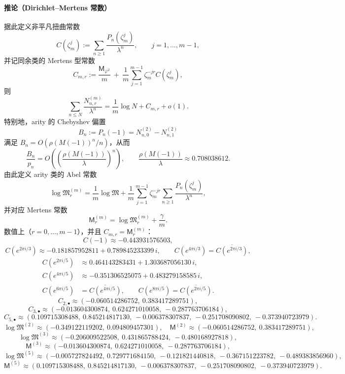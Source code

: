\paragraph{推论（Dirichlet--Mertens 常数）}
据此定义非平凡扭曲常数
\[
C(\zeta_m^j):=\sum_{n\ge 1}\frac{P_n(\zeta_m^j)}{\lambda^n},
\qquad j=1,\dots,m-1,
\]
并记同余类的 Mertens 型常数
\[
C_{m,r}:=\frac{\mathsf{M}_{\varphi^2}}{m}
\ +\ \frac{1}{m}\sum_{j=1}^{m-1}\zeta_m^{-jr}C(\zeta_m^j),
\]
则
\[
\sum_{n\le N}\frac{N_{n,r}^{(m)}}{\lambda^n}
=\frac{1}{m}\log N+C_{m,r}+o(1).
\]
特别地，arity 的 Chebyshev 偏置
\[
B_n:=P_n(-1)=N_{n,0}^{(2)}-N_{n,1}^{(2)}
\]
满足 $B_n=O(\rho(M(-1))^n/n)$，从而
\[
\frac{B_n}{p_n}=O\!\left(\left(\frac{\rho(M(-1))}{\lambda}\right)^n\right),
\qquad
\frac{\rho(M(-1))}{\lambda}\approx 0.708038612.
\]
由此定义 arity 类的 Abel 常数
\[
\log\mathfrak{M}_r^{(m)}
=\frac{1}{m}\log\mathfrak{M}
+\frac{1}{m}\sum_{j=1}^{m-1}\zeta_m^{-jr}\sum_{n\ge 1}\frac{P_n(\zeta_m^j)}{\lambda^n},
\]
并对应 Mertens 常数
\[
\mathsf{M}_r^{(m)}=\log\mathfrak{M}_r^{(m)}+\frac{\gamma}{m}.
\]
数值上（$r=0,\dots,m-1$），并且 $C_{m,r}=\mathsf{M}_r^{(m)}$：
\[
C(-1)\approx -0.443931576503,
\]
\[
C(e^{2\pi i/3})\approx -0.181857952811+0.789845233399\,i,
\qquad
C(e^{4\pi i/3})=\overline{C(e^{2\pi i/3})},
\]
\[
\begin{aligned}
C(e^{2\pi i/5})&\approx 0.464143283431+1.303687056130\,i,\\
C(e^{4\pi i/5})&\approx -0.351306525075+0.483279158585\,i,\\
C(e^{6\pi i/5})&=\overline{C(e^{4\pi i/5})},\qquad
C(e^{8\pi i/5})=\overline{C(e^{2\pi i/5})}.
\end{aligned}
\]
\[
C_{2,\bullet}\approx(-0.060514286752,\ 0.383417289751),
\]
\[
C_{3,\bullet}\approx(-0.013604300874,\ 0.624271010058,\ -0.287763706184),
\]
\[
C_{5,\bullet}\approx(0.109715308488,\ 0.845214817130,\ -0.006378307837,\ -0.251708090802,\ -0.373940723979).
\]
\[
\log\mathfrak{M}^{(2)}\approx(-0.349122119202,\ 0.094809457301),
\quad
\mathsf{M}^{(2)}\approx(-0.060514286752,\ 0.383417289751),
\]
\[
\log\mathfrak{M}^{(3)}\approx(-0.206009522508,\ 0.431865788424,\ -0.480168927818),
\]
\[
\mathsf{M}^{(3)}\approx(-0.013604300874,\ 0.624271010058,\ -0.287763706184),
\]
\[
\log\mathfrak{M}^{(5)}\approx(-0.005727824492,\ 0.729771684150,\ -0.121821440818,\ -0.367151223782,\ -0.489383856960),
\]
\[
\mathsf{M}^{(5)}\approx(0.109715308488,\ 0.845214817130,\ -0.006378307837,\ -0.251708090802,\ -0.373940723979).
\]
